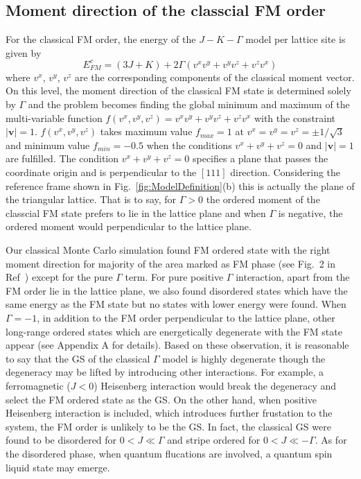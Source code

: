 \documentclass[aps,prb,reprint,amsfonts,amsmath,amssymb,showpacs,groupedaddress,superscriptaddress]{revtex4-1}
\begin{document}
\subsection{\label{sec:SectionIIIA}Moment direction of the classcial FM order}
For the classical FM order, the energy of the $J-K-\Gamma$ model per lattice site is given by
\begin{equation}
    E_{FM}^{c} = (3J + K) + 2 \Gamma (v^x v^y + v^y v^z + v^z v^x) \label{eq:EcFM}
\end{equation}
where $v^x$, $v^y$, $v^z$ are the corresponding components of the classical moment vector. On this level, the moment direction of the classical FM state is determined solely by $\Gamma$ and the problem becomes finding the global minimum and maximum of the multi-variable function $f(v^x, v^y, v^z) = v^x v^y + v^y v^z + v^z v^x$ with the constraint $|\bm{v}| = 1$. $f(v^x, v^y, v^z)$ takes maximum value $f_{max}=1$ at $v^x=v^y=v^z=\pm 1/\sqrt{3}$ and minimum value $f_{min}=-0.5$ when the conditions $v^x + v^y + v^z = 0$ and $|\bm{v}| = 1$ are fulfilled. The condition $v^x + v^y + v^z = 0$ specifies a plane that passes the coordinate origin and is perpendicular to the $[111]$ direction. Considering the reference frame shown in Fig.~\ref{fig:ModelDefinition}(b) this is actually the plane of the triangular lattice. That is to say, for $\Gamma > 0$ the ordered moment of the classcial FM state prefers to lie in the lattice plane and when $\Gamma$ is negative, the ordered moment would perpendicular to the lattice plane.

Our classical Monte Carlo simulation found FM ordered state with the right moment direction for majority of the area marked as FM phase (see Fig.~2 in Ref~) except for the pure $\Gamma$ term. For pure positive $\Gamma$ interaction, apart from the FM order lie in the lattice plane, we also found disordered states which have the same energy as the FM state but no states with lower energy were found. When $\Gamma=-1$, in addition to the FM order perpendicular to the lattice plane, other long-range ordered states which are energetically degenerate with the FM state appear (see Appendix A for details). Based on these observation, it is reasonable to say that the GS of the classical $\Gamma$ model is highly degenerate though the degeneracy may be lifted by introducing other interactions. For example, a ferromagnetic ($J<0$) Heisenberg interaction would break the degeneracy and select the FM ordered state as the GS. On the other hand, when positive Heisenberg interaction is included, which introduces further frustation to the system, the FM order is unlikely to be the GS. In fact, the classical GS were found to be disordered for $0 < J \ll \Gamma$ and stripe ordered for $0 < J \ll -\Gamma$. As for the disordered phase, when quantum flucations are involved, a quantum spin liquid state may emerge.
\end{document}
